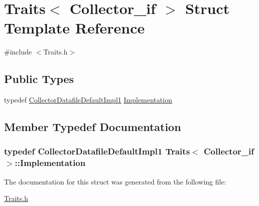 \hypertarget{struct_traits_3_01_collector__if_01_4}{}\section{Traits$<$ Collector\+\_\+if $>$ Struct Template Reference}
\label{struct_traits_3_01_collector__if_01_4}


{\ttfamily \#include $<$Traits.\+h$>$}

\subsection*{Public Types}
\begin{DoxyCompactItemize}
\item 
typedef \hyperlink{class_collector_datafile_default_impl1}{Collector\+Datafile\+Default\+Impl1} \hyperlink{struct_traits_3_01_collector__if_01_4_abde130194d214f6710d138d97449abe8}{Implementation}
\end{DoxyCompactItemize}


\subsection{Member Typedef Documentation}
\subsubsection[{\texorpdfstring{Implementation}{Implementation}}]{\setlength{\rightskip}{0pt plus 5cm}typedef {\bf Collector\+Datafile\+Default\+Impl1} {\bf Traits}$<$ {\bf Collector\+\_\+if} $>$\+::{\bf Implementation}}\hypertarget{struct_traits_3_01_collector__if_01_4_abde130194d214f6710d138d97449abe8}{}\label{struct_traits_3_01_collector__if_01_4_abde130194d214f6710d138d97449abe8}


The documentation for this struct was generated from the following file\+:\begin{DoxyCompactItemize}
\item 
\hyperlink{_traits_8h}{Traits.\+h}\end{DoxyCompactItemize}
